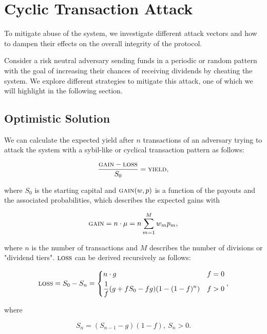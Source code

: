 \section{Cyclic Transaction Attack}

To mitigate abuse of the system, we investigate different attack vectors and how to dampen their effects on the overall integrity of the protocol. 

Consider a risk neutral adversary sending funds in a periodic or random pattern with the goal of increasing their chances of receiving dividends by cheating the system. We explore different strategies to mitigate this attack, one of which we will highlight in the following section.

\subsection{Optimistic Solution}

We can calculate the expected yield after $n$ transactions of an adversary trying to attack the system with a sybil-like or cyclical transaction pattern as follows:

\begin{equation}
    \frac{\textsc{gain}-\textsc{loss}}{S_0} = \textsc{yield},
\end{equation}

where $S_0$ is the starting capital and $\textsc{gain}(w,p)$ is a function of the payouts and the associated probabilities, which describes the expected gains with \cite{feller}

\begin{equation}
    \textsc{gain} = n \cdot \mu = n \sum_{m=1}^M w_m p_m,
\end{equation}

where $n$ is the number of transactions and $M$ describes the number of divisions or "dividend tiers". $\textsc{loss}$ can be derived recursively as follows:

\begin{equation}
    \textsc{loss} = S_0-S_n = 
    \begin{dcases} 
      n \cdot g & f = 0 \\
      \frac{1}{f}(g+fS_0-fg)(1-(1-f)^n) & f > 0 \\
    \end{dcases},
\end{equation}

where 

\begin{equation}
    S_n = (S_{n-1}-g)(1-f), \: S_n > 0.
\end{equation}

